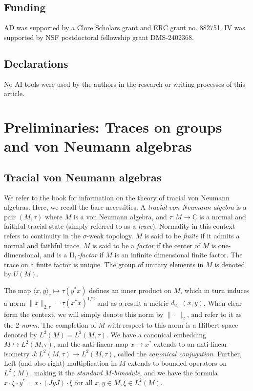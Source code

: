 \documentclass[11pt]{amsart}
\newcommand{\C}{{\mathbb{C}}}
\theoremstyle{definition}
\theoremstyle{remark}
\theoremstyle{definition}
\begin{document}
\subsection*{Funding}
AD was supported by a Clore Scholars grant and ERC grant no. 882751. IV was supported by  NSF postdoctoral fellowship grant DMS-2402368.

\subsection*{Declarations}
No AI tools were used by the authors in the research or writing processes of this article.

\section{Preliminaries: Traces on groups and von Neumann algebras}
\label{sec:preliminaries}


\subsection{Tracial von Neumann algebras}\label{subsec:von-Neumann-alg}

We refer to the book \cite{Popa} for information on the theory of tracial von Neumann algebras. Here, we recall the bare necessities.
 A \emph{tracial von Neumann algebra} is a pair $(M,\tau)$ where $M$ is a von Neumann algebra, and $\tau:M\to \C$ is a normal and faithful tracial state (simply referred to as a \emph{trace}). Normality in this context refers to continuity in the $\sigma$-weak topology.
 $M$ is said to be \emph{finite} if it admits a normal and faithful trace.
 $M$ is said to be a \emph{factor} if the center of $M$ is one-dimensional, and is a II$_1$\emph{-factor} if $M$ is an infinite dimensional finite factor.  The trace on a finite factor is unique. The group of unitary elements in $M$ is denoted by $U(M)$. 


The map $\langle x, y \rangle_\tau\mapsto \tau(y^*x)$ defines an inner product on $M$, which in turn induces a norm $\| x \|_{2,\tau} = \tau(x^*x)^{1/2}$ and as a result a metric $d_{2,\tau}(x,y)$.
When clear form the context, we will simply denote this norm by $\| \cdot \|_2$, and refer to it as the \emph{$2$-norm}.
The completion of $M$ with respect to this norm is a Hilbert space  denoted by $L^2(M) = L^{2}(M,\tau)$.
We have a canonical embedding $M\hookrightarrow L^2(M,\tau)$, and the anti-linear map $x \mapsto x^*$ extends to an anti-linear isometry $J: L^2(M, \tau) \to L^2(M,\tau)$, called the \emph{canonical conjugation}. 
Further, Left (and also right) multiplication in $M$ extends to bounded operators on $L^2(M)$, making it the \emph{standard $M$-bimodule}, and we have the formula $x \cdot \xi \cdot y^* = x\cdot (JyJ) \cdot\xi$ for all $x,y\in M, \xi \in L^2(M)$.
\end{document}
